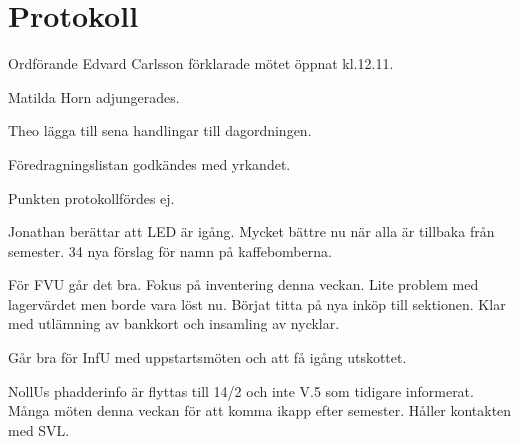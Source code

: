 \documentclass[10pt]{article}
\def\mo{Edvard Carlsson}
\begin{document}
\section*{Protokoll}
\begin{paragrafer}
Ordförande {\mo} förklarade mötet öppnat kl.12.11.

{\valavmo}

{\valavms}

{\valavj}

{\tosg}

Matilda Horn adjungerades.


Theo \ypa lägga till sena handlingar till dagordningen.



Föredragningslistan godkändes med yrkandet.


\begin{fyllnadsval} %

\end{fyllnadsval}

\begin{paragrafer}
Punkten protokollfördes ej.

Jonathan berättar att LED är igång. Mycket bättre nu när alla är tillbaka från semester. 34 nya förslag för namn på kaffebomberna.

För FVU går det bra. Fokus på inventering denna veckan. Lite problem med lagervärdet men borde vara löst nu. Börjat titta på nya inköp till sektionen. Klar med utlämning av bankkort och insamling av nycklar.

Går bra för InfU med uppstartsmöten och att få igång utskottet.

NollUs phadderinfo är flyttas till 14/2 och inte V.5 som tidigare informerat. Många möten denna veckan för att komma ikapp efter semester. Håller kontakten med SVL.


\end{paragrafer}
\end{paragrafer}
\end{document}
